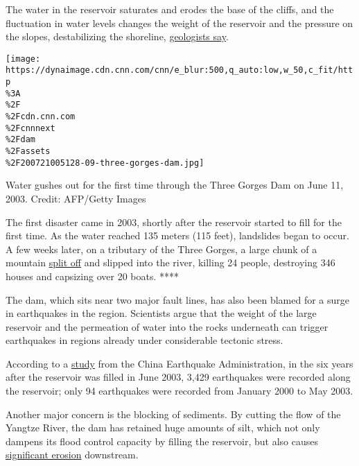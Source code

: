 The water in the reservoir saturates and erodes the base of the cliffs,
and the fluctuation in water levels changes the weight of the reservoir
and the pressure on the slopes, destabilizing the shoreline,
\href{https://www.researchgate.net/publication/262973538_Soil_erosion_in_the_Three_Gorges_Reservoir_area}{geologists
say}.

\texttt{[image: https://dynaimage.cdn.cnn.com/cnn/e\_blur:500,q\_auto:low,w\_50,c\_fit/http\\\%3A\\\%2F\\\%2Fcdn.cnn.com\\\%2Fcnnnext\\\%2Fdam\\\%2Fassets\\\%2F200721005128-09-three-gorges-dam.jpg]}

Water gushes out for the first time through the Three Gorges Dam on June
11, 2003. Credit: AFP/Getty Images

The first disaster came in 2003, shortly after the reservoir started to
fill for the first time. As the water reached 135 meters (115 feet),
landslides began to occur. A few weeks later, on a tributary of the
Three Gorges, a large chunk of a mountain
\href{https://books.google.com.hk/books?id=ATTCtJcrkt4C\&pg=PA210\&lpg=PA210\&dq=Qianjiangping+landslide\&source=bl\&ots=pSZFtOM9s3\&sig=ACfU3U1w2PdniGS4lXmc5Dg_QYpTrzW0XA\&hl=en\&sa=X\&ved=2ahUKEwiJ6qHKr9nqAhUJx4sBHTgaB4g4ChDoATAHegQIBxAB\#v=onepage\&q=Qianjiangping\%20landslide\&f=false}{split
off} and slipped into the river, killing 24 people, destroying 346
houses and capsizing over 20 boats. ****

The dam, which sits near two major fault lines, has also been blamed for
a surge in earthquakes in the region. Scientists argue that the weight
of the large reservoir and the permeation of water into the rocks
underneath can trigger earthquakes in regions already under considerable
tectonic stress.

According to a
\href{https://journal.probeinternational.org/2011/06/01/chinese-study-reveals-three-gorges-dam-triggered-3000-earthquakes-numerous-landslides/}{study}
from the China Earthquake Administration, in the six years after the
reservoir was filled in June 2003, 3,429 earthquakes were recorded along
the reservoir; only 94 earthquakes were recorded from January 2000 to
May 2003.

Another major concern is the blocking of sediments. By cutting the flow
of the Yangtze River, the dam has retained huge amounts of silt, which
not only dampens its flood control capacity by filling the reservoir,
but also causes
\href{https://www.reuters.com/article/environment-china-environment-dam-dc/three-gorges-dam-causes-downstream-erosion-study-idUST31738620070521}{significant
erosion} downstream.


